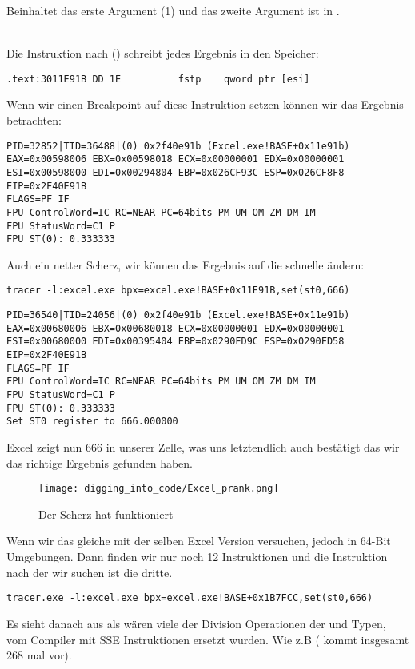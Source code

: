  Beinhaltet das erste Argument (1) und das zweite Argument ist in \TT{[EBX]}.\\
\\

Die Instruktion nach \FDIV () schreibt jedes Ergebnis in den Speicher:\\

\begin{lstlisting}[style=customasmx86]
.text:3011E91B DD 1E          fstp    qword ptr [esi]
\end{lstlisting}

Wenn wir einen Breakpoint auf diese Instruktion setzen k\"onnen wir das Ergebnis betrachten:

\begin{lstlisting}
PID=32852|TID=36488|(0) 0x2f40e91b (Excel.exe!BASE+0x11e91b)
EAX=0x00598006 EBX=0x00598018 ECX=0x00000001 EDX=0x00000001
ESI=0x00598000 EDI=0x00294804 EBP=0x026CF93C ESP=0x026CF8F8
EIP=0x2F40E91B
FLAGS=PF IF
FPU ControlWord=IC RC=NEAR PC=64bits PM UM OM ZM DM IM 
FPU StatusWord=C1 P 
FPU ST(0): 0.333333
\end{lstlisting}

Auch ein netter Scherz, wir k\"onnen das Ergebnis auf die schnelle \"andern:

\begin{lstlisting}
tracer -l:excel.exe bpx=excel.exe!BASE+0x11E91B,set(st0,666)
\end{lstlisting}

\begin{lstlisting}
PID=36540|TID=24056|(0) 0x2f40e91b (Excel.exe!BASE+0x11e91b)
EAX=0x00680006 EBX=0x00680018 ECX=0x00000001 EDX=0x00000001
ESI=0x00680000 EDI=0x00395404 EBP=0x0290FD9C ESP=0x0290FD58
EIP=0x2F40E91B
FLAGS=PF IF
FPU ControlWord=IC RC=NEAR PC=64bits PM UM OM ZM DM IM 
FPU StatusWord=C1 P 
FPU ST(0): 0.333333
Set ST0 register to 666.000000
\end{lstlisting}

Excel zeigt nun 666 in unserer Zelle, was uns letztendlich auch best\"atigt das wir das richtige Ergebnis gefunden haben.

\begin{figure}[H]
\centering
\texttt{[image: digging\_into\_code/Excel\_prank.png]}
\caption{Der Scherz hat funktioniert}
\end{figure}

Wenn wir das gleiche mit der selben Excel Version versuchen, jedoch in 64-Bit Umgebungen.
Dann finden wir nur noch 12 \FDIV Instruktionen und die Instruktion nach der wir suchen ist
die dritte. 

\begin{lstlisting}
tracer.exe -l:excel.exe bpx=excel.exe!BASE+0x1B7FCC,set(st0,666)
\end{lstlisting}


Es sieht danach aus als w\"aren viele der Division Operationen der \Tfloat und \Tdouble Typen, vom Compiler mit SSE Instruktionen ersetzt wurden.
Wie z.B  ( kommt insgesamt 268 mal vor).
